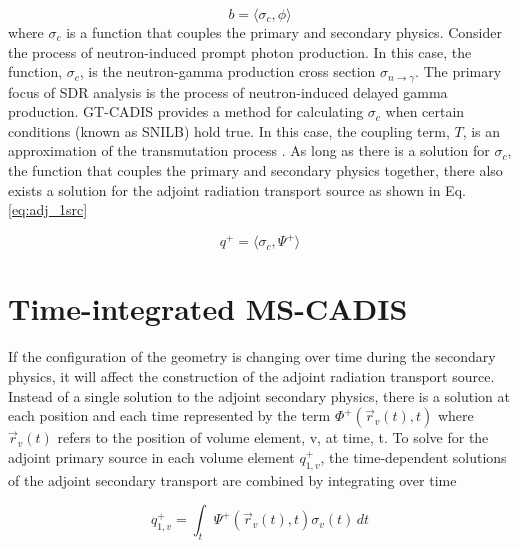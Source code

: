 \begin{equation}\label{eq:fwd_2src}
	 b =
	 \langle \sigma_c, \phi \rangle
 \end{equation}
where $\sigma_c$ is a function that couples the primary
and secondary physics.
Consider the process of neutron-induced prompt photon production.
In this case, the function, $\sigma_c$, is the neutron-gamma production
cross section $\sigma_{n\rightarrow\gamma}$.  The primary focus of SDR analysis
is the process of neutron-induced delayed gamma production. 
GT-CADIS provides a method for calculating $\sigma_c$ when
certain conditions (known as SNILB) hold true. In this case, the
coupling term, $T$, is an approximation of the transmutation
process \cite{gtcadis}.  As long as there is a solution for $\sigma_c$, the
function that couples the primary and secondary physics together,
there also exists a solution for the adjoint radiation transport source as shown in Eq.
\ref{eq:adj_1src}

 \begin{equation}\label{eq:adj_1src}
	 q^{+} = 
	 \langle \sigma_c, \Psi^{+} \rangle
 \end{equation}


\section{Time-integrated MS-CADIS}
If the configuration of the geometry is changing over time during
the secondary physics, it will affect the construction of the adjoint radiation
transport source.  Instead of a single solution to the adjoint secondary
physics, there is a solution at each position and each time represented by the term
	$ \Phi^{+}(\overrightarrow{r}_{v}(t), t)$
where $\overrightarrow{r}_{v}(t)$ refers to the position of volume element, v,
at time, t. 
To solve for the adjoint primary source in each volume element
$q_{1,v}^{+}$, the time-dependent solutions of the 
adjoint secondary transport are combined by integrating over time

 \begin{equation}\label{eq:adj_src_1_avg}
	 q_{1,v}^{+} =
	 \int_{t}  \Psi^{+}(\overrightarrow{r}_{v}(t), t)
	 \sigma_{v}(t)\, dt
 \end{equation}
 
